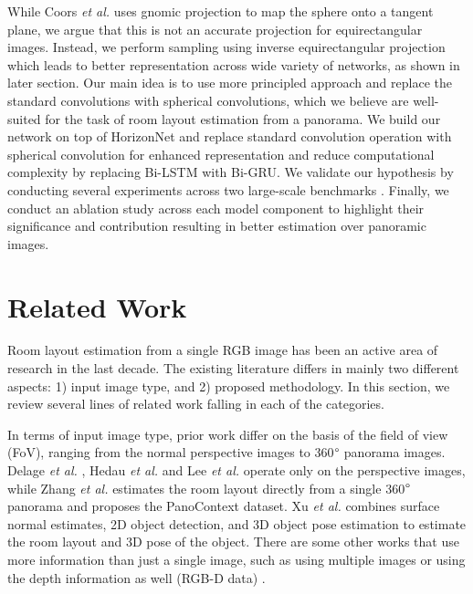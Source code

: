\documentclass[final]{cvpr}
\begin{document}
While Coors \textit{et al.} \cite{coors2018spherenet} uses gnomic projection to map the sphere onto a tangent plane, we argue that this is not an accurate projection for equirectangular images. Instead, we perform sampling using inverse equirectangular projection which leads to better representation across wide variety of networks, as shown in later section. Our main idea is to use more principled approach and replace the standard convolutions with spherical convolutions, which we believe are well-suited for the task of room layout estimation from a panorama. We build our network on top of HorizonNet \cite{sun2019horizonnet} and replace standard convolution operation with spherical convolution for enhanced representation and reduce computational complexity by replacing Bi-LSTM with Bi-GRU. We validate our hypothesis by conducting several experiments across two large-scale benchmarks \cite{zhang2014panocontext, armeni2017joint}. Finally, we conduct an ablation study across each model component to highlight their significance and contribution resulting in better estimation over panoramic images. 



\section{Related Work}\label{sec:related work}


Room layout estimation from a single RGB image has been an active area of research in the last decade. The existing literature differs in mainly two different aspects: 1) input image type, and 2) proposed methodology. In this section, we review several lines of
related work falling in each of the categories.




In terms of input image type, prior work differ on the basis of the field of view (FoV), ranging from the normal perspective images to 360$\degree$ panorama images. Delage \textit{et al.} \cite{delage2006dynamic},  Hedau \textit{et al.} \cite{hedau2009recovering} and Lee \textit{et al.} \cite{lee2009geometric} operate only on the perspective images, while Zhang \textit{et al.} \cite{zhang2014panocontext} estimates the room layout directly from a single 360$\degree$ panorama and proposes the PanoContext dataset. Xu \textit{et al.} \cite{xu2017pano2cad} combines surface normal estimates, 2D object detection, and 3D object pose estimation to estimate the room layout and 3D pose of the object. There are some other works that use more information than just a single image, such as using multiple images \cite{cabral2014piecewise} or using the depth information as well (RGB-D data) \cite{liu2016layered, guo2015predicting, zhang2013estimating}.
\end{document}
